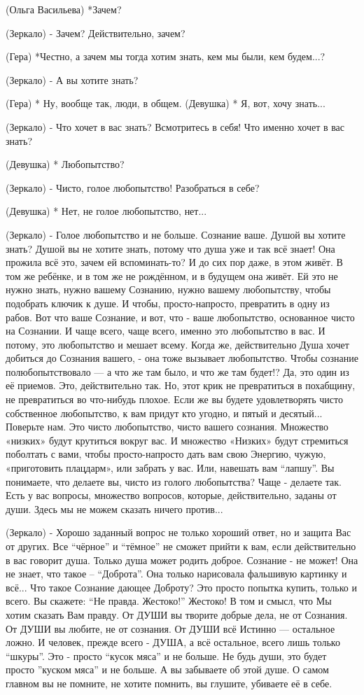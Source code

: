 (Ольга Васильева) *Зачем?

(Зеркало) - Зачем? Действительно, зачем?

(Гера) *Честно, а зачем мы тогда хотим знать, кем мы были, кем будем...? 

(Зеркало) - А вы хотите знать? 

(Гера) * Ну, вообще так, люди, в общем.
(Девушка) * Я, вот, хочу знать...

(Зеркало) - Что хочет в вас знать? Всмотритесь в себя! Что именно хочет в вас знать? 

(Девушка) * Любопытство?

(Зеркало) - Чисто, голое любопытство! Разобраться в себе?

(Девушка) * Нет, не голое любопытство, нет...

(Зеркало) - Голое любопытство и не больше. Сознание ваше. Душой вы хотите знать? Душой вы не хотите знать, потому что душа уже и так всё знает! Она прожила всё это, зачем ей вспоминать-то? И до сих пор даже, в этом живёт. В том же ребёнке, и в том же не рождённом, и в будущем она живёт. Ей это не нужно знать, нужно вашему Сознанию, нужно вашему любопытству, чтобы подобрать ключик к душе. И чтобы, просто-напросто, превратить в одну из рабов. Вот что ваше Сознание, и вот, что - ваше любопытство, основанное чисто на Сознании. И чаще всего, чаще всего, именно это любопытство в вас. И потому, это любопытство и мешает всему. Когда же, действительно Душа хочет добиться до Сознания вашего, - она тоже вызывает любопытство. Чтобы сознание полюбопытствовало — а что же там было, и что же там будет!?  Да, это один из её приемов. Это, действительно так. Но, этот крик не превратиться в похабщину, не превратиться во что-нибудь плохое. Если же вы будете удовлетворять чисто собственное любопытство, к вам придут кто угодно, и пятый и десятый... Поверьте нам. Это чисто любопытство, чисто вашего сознания. Множество «низких» будут крутиться вокруг вас. И множество «Низких» будут стремиться поболтать с вами, чтобы просто-напросто дать вам свою Энергию, чужую, «приготовить плацдарм», или забрать у вас. Или, навешать вам “лапшу”. Вы понимаете, что делаете вы, чисто из голого любопытства? Чаще - делаете так. Есть у вас вопросы, множество вопросов, которые, действительно, заданы от души. Здесь мы не можем сказать ничего против...

(Зеркало) - Хорошо заданный вопрос не только хороший ответ, но и защита Вас от других. Все “чёрное” и “тёмное” не сможет прийти к вам, если действительно в вас говорит душа. Только душа может родить доброе. Сознание - не может! Она не знает, что такое – “Доброта”. Она только нарисовала фальшивую картинку и всё... Что такое Сознание дающее Доброту? Это просто попытка купить, только и всего. Вы скажете: “Не правда. Жестоко!” Жестоко! В том и смысл, что Мы хотим сказать Вам правду.  От ДУШИ вы творите добрые дела, не от Сознания. От ДУШИ вы любите, не от сознания. От ДУШИ всё Истинно — остальное ложно. И человек, прежде всего - ДУША, а всё остальное, всего лишь только “шкуры”. Это - просто “кусок мяса” и не больше. Не будь души,  это будет просто ”куском мяса” и не больше. А вы забываете об этой душе. О самом главном вы не помните, не хотите помнить, вы глушите, убиваете её в себе.

